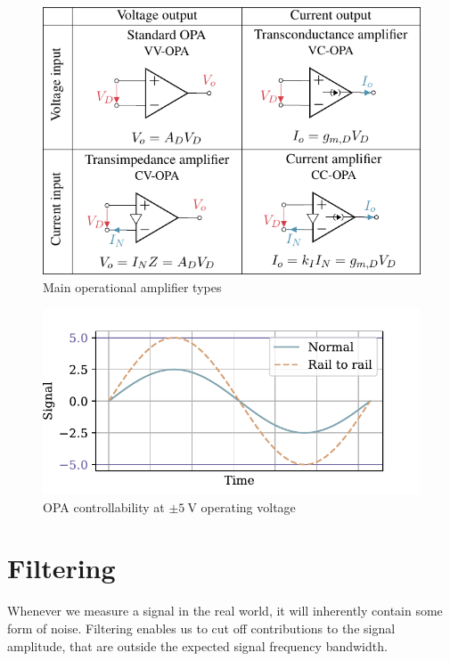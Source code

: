 \begin{figure}[htb!]
  \centering
  \includegraphics[scale=1]{figures/electronics/op_amp/op_amp_types/op_amp_types}
  \caption[Main OPA types]{Main operational amplifier types%
  \label{fig:op_amp_types}}
\end{figure}

\begin{figure}[htb!]
  \centering
  \includegraphics[scale=0.72]{figures/electronics/op_amp/plot_opamp_railrail}
  \caption[OPA controllability]{OPA controllability at $\pm\SI{5}{\volt}$ operating voltage%
    \label{fig:plot_opamp_railrail}}
\end{figure}

\section{Filtering}

Whenever we measure a signal in the real world, it will inherently contain some form of noise. Filtering enables us to cut off contributions to the signal amplitude, that are outside the expected signal frequency bandwidth.

